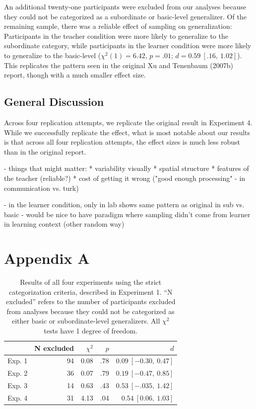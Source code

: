 \documentclass[man]{apa2}
\begin{document}
An additional twenty-one participants were excluded from our analyses because they could not be categorized as a subordinate or basic-level generalizer. Of the remaining sample, there was a reliable effect of sampling on generalization: Participants in the teacher condition were more likely to generalize to the subordinate category, while participants in the learner condition were more likely to generalize to the basic-level ($\chi^2(1) = 6.42$,  $p = .01$; $d = 0.59\ [.16,\ 1.02]$). This replicates the pattern seen in the original Xu and Tenenbaum (2007b) report, though with a much smaller effect size.

\subsection{General Discussion}
Across four replication attempts, we replicate the original result in Experiment 4. While we successfully replicate the effect, what is most notable about our results is that across all four replication attempts, the effect sizes is much less robust than in the original report. 

- things that might matter:
* variability visually
* spatial structure
* features of the teacher (reliable?)
* cost of getting it wrong ("good enough processing" - in communication vs. turk) 

-  in the learner condition, only in lab shows same pattern as original in sub vs. basic
- would be nice to have paradigm where sampling didn't come from learner in learning context (other random way)


\section{Appendix A}

\begin{table}[h]
\centering
\begin{tabular}{rrrrr}
 \hline
  & N excluded & $\chi^2$ & $p$ & $d$ \\ 
 \hline
Exp. 1 & 94 & 0.08 & .78 & $0.09\ [-0.30,\ 0.47]$\\ 
Exp. 2 & 36 & 0.07 & .79 & $0.19\ [-0.47,\ 0.85]$ \\ 
Exp. 3 & 14 & 0.63 & .43 & $0.53\ [-.035,\ 1.42]$ \\ 
Exp. 4 & 31 & 4.13 & .04 & $0.54\ [0.06,\ 1.03]$\\ 
  \hline
\end{tabular}
\caption{Results of all four experiments using the strict categorization criteria, described in Experiment 1. ``N excluded'' refers to the number of participants excluded from analyses because they could not be categorized as either basic or subordinate-level generalizers. All $\chi^2$ tests have 1 degree of freedom. }
\label{strictResults}
\end{table}
\end{document}
